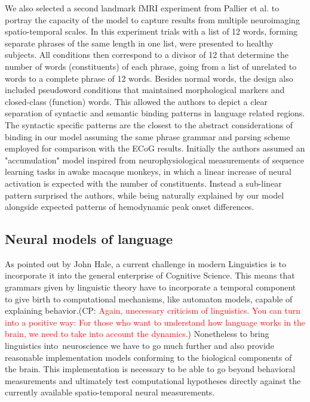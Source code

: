 \documentclass[10pt]{article}
\newcommand{\noteCP}[1]{(CP: \textcolor{red}{#1})}
\begin{document}
We also selected a second landmark fMRI experiment from Pallier et al.\cite{Pallier_2011} to portray the capacity of the model to capture results from multiple neuroimaging spatio-temporal scales.
In this experiment trials with a list of 12 words, forming separate phrases of the same length in one list, were presented to healthy subjects.
All conditions then correspond to a divisor of 12 that determine the number of words (constituents) of each phrase, going from a list of unrelated to words to a complete phrase of 12 words.
Besides normal words, the design also included pseudoword conditions that maintained morphological markers and closed-class (function) words.
This allowed the authors to depict a clear separation of syntactic and semantic binding patterns in language related regions.
The syntactic specific patterns are the closest to the abstract considerations of binding in our model assuming the same phrase grammar and parsing scheme employed for comparison with the ECoG results.
Initially the authors assumed an "accumulation" model inspired from neurophysiological measurements of sequence learning tasks in awake macaque monkeys, in which a linear increase of neural activation is expected with the number of constituents.
Instead a sub-linear pattern surprised the authors, while being naturally explained by our model alongside expected patterns of hemodynamic peak onset differences.


\subsection{Neural models of language}

{\label{619233}}

As pointed out by John Hale\cite{hale2014automaton}, a current
challenge in modern Linguistics is to incorporate it into the general
enterprise of Cognitive Science. This means that grammars given by
linguistic theory have to incorporate a temporal component to give
birth to computational mechanisms, like automaton models, capable of
explaining behavior.\noteCP{Again, unecessary criticism of
  linguistics. You can turn into a positive way: For those who want to
  understand how language works in the brain, we need to take into
  account the dynamics.} Nonetheless to bring linguistics
into~neuroscience we have to go much further and also provide
reasonable implementation models conforming to the biological
components of the brain. This implementation is necessary to be able
to go beyond behavioral measurements and ultimately test computational
hypotheses directly against the currently available spatio-temporal
neural measurements.
\end{document}

